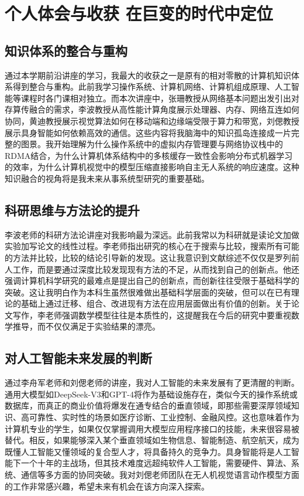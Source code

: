 \chapter{个人体会与收获 在巨变的时代中定位}

\section{知识体系的整合与重构}

通过本学期前沿讲座的学习，我最大的收获之一是原有的相对零散的计算机知识体系得到整合与重构。此前我学习操作系统、计算机网络、计算机组成原理、人工智能等课程时各门课相对独立。而本次讲座中，张珊教授从网络基本问题出发引出对存算传融合的需求，李波教授从高性能计算角度展示处理器、内存、网络互连如何协同，黄迪教授展示视觉算法如何在移动端和边缘端受限于算力和带宽，刘偲教授展示具身智能如何依赖高效的通信。这些内容将我脑海中的知识孤岛连接成一片完整的图景。我开始理解为什么操作系统中的虚拟内存管理要与网络协议栈中的RDMA结合，为什么计算机体系结构中的多核缓存一致性会影响分布式机器学习的效率，为什么计算机视觉中的模型压缩直接影响自主无人系统的响应速度。这种知识融合的视角将是我未来从事系统型研究的重要基础。

\section{科研思维与方法论的提升}

李波老师的科研方法论讲座对我影响最为深远。此前我常以为科研就是读论文加做实验加写论文的线性过程。李老师指出研究的核心在于搜索与比较，搜索所有可能的方法并比较，比较的结论引导新的发现。这让我意识到文献综述不仅仅是罗列前人工作，而是要通过深度比较发现现有方法的不足，从而找到自己的创新点。他还强调计算机科学研究的最难点是提出自己的创新点，而创新往往受限于基础科学的突破。这让我明白作为本科生虽然很难做出基础科学层面的突破，但可以在已有理论的基础上通过迁移、组合、改进现有方法在应用层面做出有价值的创新。关于论文写作，李老师强调数学模型往往是本质性的，这提醒我在今后的研究中要重视数学推导，而不仅仅满足于实验结果的漂亮。

\section{对人工智能未来发展的判断}

通过李舟军老师和刘偲老师的讲座，我对人工智能的未来发展有了更清醒的判断。通用大模型如DeepSeek-V3和GPT-4将作为基础设施存在，类似今天的操作系统或数据库，而真正的商业价值将爆发在通专结合的垂直领域，即那些需要深厚领域知识、高可靠性、实时性的场景如医疗诊断、工业控制、金融风控。这也意味着作为计算机专业的学生，如果仅仅掌握调用大模型应用程序接口的技能，未来很容易被替代。相反，如果能够深入某个垂直领域如生物信息、智能制造、航空航天，成为既懂人工智能又懂领域的复合型人才，将具备持久的竞争力。具身智能将是人工智能下一个十年的主战场，但其技术难度远超纯软件人工智能，需要硬件、算法、系统、通信等多方面的协同突破。我对刘偲老师团队在无人机视觉语言动作模型方面的工作非常感兴趣，希望未来有机会在该方向深入探索。

